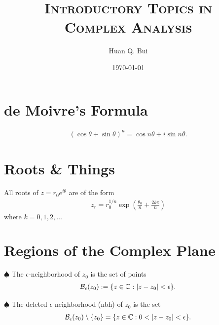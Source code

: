 \documentclass{article}
\theoremstyle{definition}
\newcommand{\f}[2]{\frac{#1}{#2}}
\newcommand{\C}{\mathbb{C}}
\newcommand{\B}{\mathcal{B}}
\newcommand{\lp}{\left(}
\newcommand{\rp}{\right)}
\begin{document}
	\begin{titlepage}\centering
		\clearpage
		\title{\textsc{\bf{Introductory Topics in \\ Complex Analysis}}}
		\author{\bigskip Huan Q. Bui}
		\date{\today}
		\maketitle
		\thispagestyle{empty}
	\end{titlepage}




\newpage
\tableofcontents
\newpage



\section{de Moivre's Formula}

\begin{align}
(\cos\theta + \sin\theta)^n = \cos n \theta + i\sin n \theta.
\end{align}

\section{Roots \& Things}

All roots of $z = r_0 e^{i\theta}$ are of the form
\begin{align}
z_r = r_0^{1/n}\exp\lp \f{\theta_0}{n} + \f{2k \pi}{n} \rp
\end{align}
where $k = 0,1,2,\dots$


\section{Regions of the Complex Plane}

\noindent $\spadesuit$ The $\epsilon$-neighborhood of $z_0$ is the set of points
\begin{align}
\B_\epsilon (z_0) := \{ z\in \C : \abs{z - z_0} < \epsilon \}.
\end{align}

\noindent $\spadesuit$ The deleted $\epsilon$-neighborhood (nbh) of $z_0$ is the set
\begin{align}
\B_\epsilon(z_0) \setminus \{z_0\} = \{ z\in \C : 0 < \abs{z - z_0} < \epsilon \}.
\end{align}
\end{document}
